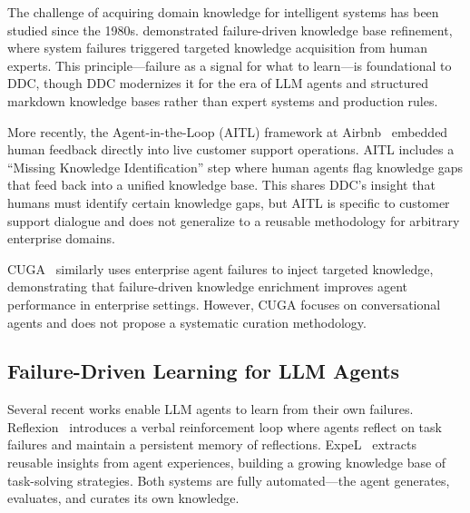 \documentclass[11pt,a4paper]{article}
\begin{document}
The challenge of acquiring domain knowledge for intelligent systems has been studied since the 1980s. \citet{pazzani1986failure} demonstrated failure-driven knowledge base refinement, where system failures triggered targeted knowledge acquisition from human experts. This principle---failure as a signal for what to learn---is foundational to DDC, though DDC modernizes it for the era of LLM agents and structured markdown knowledge bases rather than expert systems and production rules.

More recently, the Agent-in-the-Loop (AITL) framework at Airbnb~\citep{zhao2025aitl} embedded human feedback directly into live customer support operations. AITL includes a ``Missing Knowledge Identification'' step where human agents flag knowledge gaps that feed back into a unified knowledge base. This shares DDC's insight that humans must identify certain knowledge gaps, but AITL is specific to customer support dialogue and does not generalize to a reusable methodology for arbitrary enterprise domains.

CUGA~\citep{ibm2025cuga} similarly uses enterprise agent failures to inject targeted knowledge, demonstrating that failure-driven knowledge enrichment improves agent performance in enterprise settings. However, CUGA focuses on conversational agents and does not propose a systematic curation methodology.

\subsection{Failure-Driven Learning for LLM Agents}

Several recent works enable LLM agents to learn from their own failures. Reflexion~\citep{shinn2023reflexion} introduces a verbal reinforcement loop where agents reflect on task failures and maintain a persistent memory of reflections. ExpeL~\citep{zhao2023expel} extracts reusable insights from agent experiences, building a growing knowledge base of task-solving strategies. Both systems are fully automated---the agent generates, evaluates, and curates its own knowledge.

%
\end{document}
